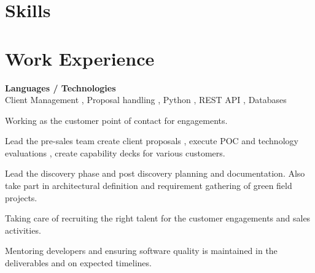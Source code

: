 \documentclass[a4,10pt]{cv4tw}
\begin{document}
    \section{Skills}
    \begin{skills}{}
    \end{skills}

    \section{Work Experience}
    {\textbf{Languages / Technologies} \\Client Management , Proposal handling , Python  , REST API , Databases }
    {
        \begin{missions}
        \item Working as the customer point of contact for engagements.
        \item Lead the pre-sales team create client proposals , execute POC and technology evaluations , create capability decks for various customers.
        \item Lead the discovery phase and post discovery planning and documentation. Also take part in architectural definition and requirement gathering of green field projects.
        \item Taking care of recruiting the right talent for the customer engagements and sales activities.
        \item Mentoring developers and ensuring software quality is maintained in the deliverables and on expected timelines.
        \end{missions}
        }
\end{document}
